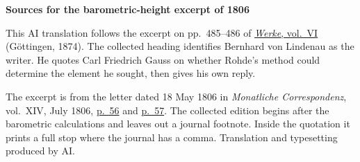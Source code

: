\clearpage\thispagestyle{empty}
\begin{center}\textbf{Sources for the barometric-height excerpt of 1806}\end{center}
\noindent This AI translation follows the excerpt on pp.~485--486 of \href{https://gdz.sub.uni-goettingen.de/id/PPN236007467}{\textit{Werke}, vol.~VI} (Göttingen, 1874). The collected heading identifies Bernhard von Lindenau as the writer. He quotes Carl Friedrich Gauss on whether Rohde’s method could determine the element he sought, then gives his own reply.
\par\smallskip\noindent The excerpt is from the letter dated 18 May 1806 in \textit{Monatliche Correspondenz}, vol.~XIV, July 1806, \href{https://api.digitale-sammlungen.de/iiif/image/v2/bsb10538606_00066/full/1500,/0/default.jpg}{p.~56} and \href{https://api.digitale-sammlungen.de/iiif/image/v2/bsb10538606_00067/full/1500,/0/default.jpg}{p.~57}. The collected edition begins after the barometric calculations and leaves out a journal footnote. Inside the quotation it prints a full stop where the journal has a comma. Translation and typesetting produced by AI.
\clearpage
